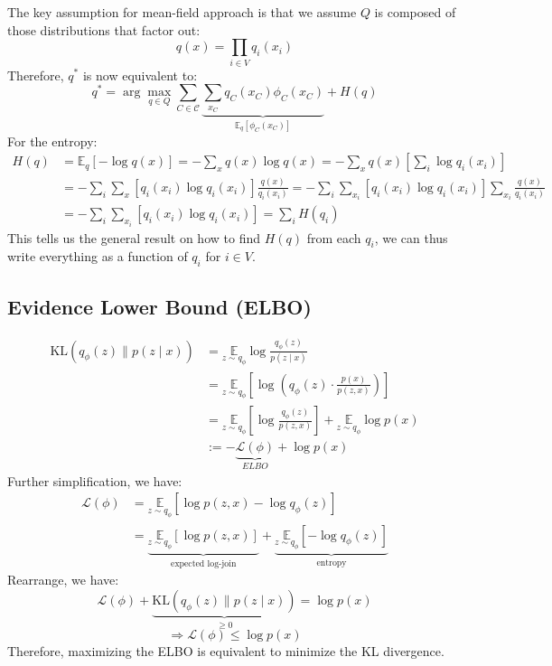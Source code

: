 The key assumption for mean-field approach is that we assume $Q$ is composed of those distributions that factor out:
$$q(x)=\prod_{i \in V} q_i\left(x_i\right)$$
Therefore, $q^*$ is now equivalent to:
$$
q^*=\arg \max _{q \in Q} \sum_{C \in \mathcal{C}} \underbrace{\sum_{x_C} q_C\left(x_C\right) \phi_C\left(x_C\right)}_{\mathbb{E}_q\left[\phi_C\left(x_C\right)\right]}+H(q)
$$
For the entropy:
$$
\begin{aligned}
H(q) & =\mathbb{E}_q[-\log q(x)]=-\sum_x q(x) \log q(x)=-\sum_x q(x)\left[\sum_i \log q_i\left(x_i\right)\right] \\
& =-\sum_i \sum_x\left[q_i\left(x_i\right) \log q_i\left(x_i\right)\right] \frac{q(x)}{q_i\left(x_i\right)}=-\sum_i \sum_{x_i}\left[q_i\left(x_i\right) \log q_i\left(x_i\right)\right] \sum_{x_i} \frac{q(x)}{q_i\left(x_i\right)} \\
& =-\sum_i \sum_{x_i}\left[q_i\left(x_i\right) \log q_i\left(x_i\right)\right]=\sum_i H\left(q_i\right)
\end{aligned}
$$
This tells us the general result on how to find $H(q)$ from each $q_i$, we can thus write everything as a function of $q_i$ for $i \in V$.

\subsection{Evidence Lower Bound (ELBO)}
\begin{align*} 
    \mathrm{KL}\left(q_\phi(z) \| p(z \mid x)\right) & =\underset{z \sim q_\phi}{\mathbb{E}} \log \frac{q_\phi(z)}{p(z \mid x)} \\ 
    & =\underset{z \sim q_\phi}{\mathbb{E}}\left[\log \left(q_\phi(z) \cdot \frac{p(x)}{p(z, x)}\right)\right] \\ 
    & =\underset{z \sim q_\phi}{\mathbb{E}}\left[\log \frac{q_\phi(z)}{p(z, x)}\right]+\underset{z \sim q_\phi}{\mathbb{E}} \log p(x) \\ 
    & :=-\underbrace{\mathcal{L}(\phi)}_{ELBO}+\log p(x)
\end{align*}
Further simplification, we have:
\begin{align*}
\mathcal{L}(\phi)&=\underset{z \sim q_\phi}{\mathbb{E}}\left[\log p(z, x)-\log q_\phi(z)\right]\\
&=\underbrace{\underset{z \sim q_\phi}{\mathbb{E}}[\log p(z, x)]}_{\text{expected log-join}}+\underbrace{\underset{z \sim q_\phi}{\mathbb{E}}\left[-\log q_\phi(z)\right]}_{\text{entropy}}
\end{align*}
Rearrange, we have:
$$\mathcal{L}(\phi)+\underbrace{\mathrm{KL}\left(q_\phi(z) \| p(z \mid x)\right)}_{\geq 0}=\log p(x)$$
$$\Rightarrow \mathcal{L}(\phi)\leq \log p(x)$$
Therefore, maximizing the ELBO is equivalent to minimize the KL divergence.
